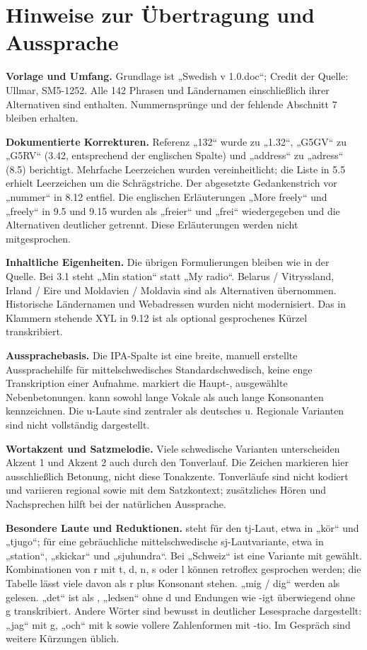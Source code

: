 \documentclass[a4paper,landscape,10pt]{article}
\newcommand{\ipa}[1]{{\ipafont[#1]}}
\begin{document}
\section*{Hinweise zur Übertragung und Aussprache}
\fontsize{8.5}{10}\selectfont\raggedright
\textbf{Vorlage und Umfang.} Grundlage ist „Swedish v 1.0.doc“; Credit der Quelle: Ullmar, SM5-1252.
Alle 142 Phrasen und Ländernamen einschließlich ihrer Alternativen sind enthalten. Nummernsprünge und der fehlende Abschnitt 7 bleiben erhalten.

\smallskip
\textbf{Dokumentierte Korrekturen.} Referenz „132“ wurde zu „1.32“, „G5GV“ zu „G5RV“
(3.42, entsprechend der englischen Spalte) und „address“ zu „adress“ (8.5) berichtigt.
Mehrfache Leerzeichen wurden vereinheitlicht; die Liste in 5.5 erhielt Leerzeichen um die Schrägstriche.
Der abgesetzte Gedankenstrich vor „nummer“ in 8.12 entfiel. Die englischen Erläuterungen „More freely“
und „freely“ in 9.5 und 9.15 wurden als „freier“ und „frei“ wiedergegeben und die Alternativen deutlicher
getrennt. Diese Erläuterungen werden nicht mitgesprochen.

\smallskip
\textbf{Inhaltliche Eigenheiten.} Die übrigen Formulierungen bleiben wie in der Quelle. Bei 3.1 steht „Min station“ statt „My radio“.
Belarus / Vitryssland, Irland / Eire und Moldavien / Moldavia sind als Alternativen übernommen.
Historische Ländernamen und Webadressen wurden nicht modernisiert. Das in Klammern stehende XYL in
9.12 ist als optional gesprochenes Kürzel transkribiert.

\smallskip
\textbf{Aussprachebasis.} Die IPA-Spalte ist eine breite, manuell erstellte Aussprachehilfe für
mittelschwedisches Standardschwedisch, keine enge Transkription einer Aufnahme. \ipa{ˈ} markiert die
Haupt-, \ipa{ˌ} ausgewählte Nebenbetonungen. \ipa{ː} kann sowohl lange Vokale als auch lange Konsonanten
kennzeichnen. Die u-Laute \ipa{ʉː, ɵ} sind zentraler als deutsches u. Regionale Varianten sind nicht vollständig dargestellt.

\smallskip
\textbf{Wortakzent und Satzmelodie.} Viele schwedische Varianten unterscheiden Akzent 1 und Akzent 2
auch durch den Tonverlauf. Die Zeichen \ipa{ˈ, ˌ} markieren hier ausschließlich Betonung, nicht diese
Tonakzente. Tonverläufe sind nicht kodiert und variieren regional sowie mit dem Satzkontext; zusätzliches Hören
und Nachsprechen hilft bei der natürlichen Aussprache.

\smallskip
\textbf{Besondere Laute und Reduktionen.} \ipa{ɕ} steht für den tj-Laut, etwa in „kör“ und „tjugo“;
\ipa{ɧ} für eine gebräuchliche mittelschwedische sj-Lautvariante, etwa in „station“, „skickar“ und „sjuhundra“.
Bei „Schweiz“ ist eine Variante mit \ipa{ʂ} gewählt. Kombinationen von r mit t, d, n, s oder l können
retroflex gesprochen werden; die Tabelle lässt viele davon als r plus Konsonant stehen.
„mig / dig“ werden als \ipa{mɛj / dɛj} gelesen. „det“ ist als \ipa{deː}, „ledsen“ ohne d und Endungen
wie -igt überwiegend ohne g transkribiert. Andere Wörter sind bewusst in deutlicher Lesesprache dargestellt:
„jag“ mit g, „och“ mit k sowie vollere Zahlenformen mit -tio. Im Gespräch sind weitere Kürzungen üblich.
\end{document}
